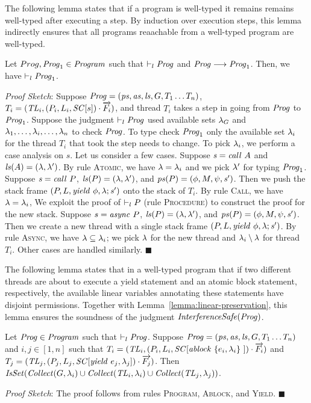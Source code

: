 The following lemma states that if a program is well-typed it remains remains well-typed after executing a step.
By induction over execution steps, this lemma indirectly ensures that all programs reaachable from a well-typed program 
are well-typed.
\begin{lemma}
\label{lemma:linear-preservation}
Let $Prog, \mathit{Prog}_1 \in \mathit{Program}$ such that $\vdash_l \mathit{Prog}$ and $\mathit{Prog} \longrightarrow \mathit{Prog}_1$.
Then, we have $\vdash_l \mathit{Prog}_1$.
\end{lemma}
{\em Proof Sketch}:
Suppose $\mathit{Prog} = (\mathit{ps}, \mathit{as}, \mathit{ls}, G, T_1 \ldots T_n)$, 
$T_i = (\mathit{TL}_i,(P_i,L_i,\mathit{SC}[s])\cdot\overrightarrow{F_i})$,
and thread $T_i$ takes a step in going from $\mathit{Prog}$ to $\mathit{Prog}_1$.
Suppose the judgment $\vdash_l \mathit{Prog}$ used available sets $\lambda_G$ and $\lambda_1,\ldots,\lambda_i,\ldots,\lambda_n$
to check $\mathit{Prog}$.
To type check $\mathit{Prog}_1$ only the available set $\lambda_i$ for the thread $T_i$ that took the step needs to change.
To pick $\lambda_i$, we perform a case analysis on $s$.
Let us consider a few cases.
Suppose $\mathit{s} = \mathit{call}\ A$ and $\mathit{ls}(A) = (\lambda,\lambda')$.
By rule \textsc{Atomic}, we have $\lambda = \lambda_i$ and we pick $\lambda'$ for typing $\mathit{Prog}_1$.
Suppose $\mathit{s} = \mathit{call}\ P$, $\mathit{ls}(P) = (\lambda,\lambda')$, and $\mathit{ps}(P) = (\phi, M, \psi, \mathit{s}')$.
Then we push the stack frame $(P,L,\mathit{yield}\ \phi,\lambda;\mathit{s}')$ onto the stack of $T_i$.
By rule \textsc{Call}, we have $\lambda = \lambda_i$,
We exploit the proof of $\vdash_l P$ (rule \textsc{Procedure}) to construct the proof for the new stack.
Suppose $s = \mathit{async}\ P$, $\mathit{ls}(P) = (\lambda,\lambda')$, and $\mathit{ps}(P) = (\phi, M, \psi, \mathit{s}')$.
Then we create a new thread with a single stack frame $(P,L,\mathit{yield}\ \phi,\lambda;\mathit{s}')$.
By rule \textsc{Async}, we have $\lambda \subseteq \lambda_i$;
we pick $\lambda$ for the new thread and $\lambda_i \setminus \lambda$ for thread $T_i$.
Other cases are handled similarly.
$\blacksquare$

The following lemma states that in a well-typed program that if two different threads 
are about to execute a yield statement and an atomic block statement, respectively,
the available linear variables annotating these statements have disjoint permissions.
Together with Lemma~\ref{lemma:linear-preservation}, this lemma ensures the soundness of the judgment $\mathit{InterferenceSafe}(\mathit{Prog})$.
\begin{lemma}
\label{lemma:linear-non-interference}
Let $\mathit{Prog} \in \mathit{Program}$ such that $\vdash_l \mathit{Prog}$.
Suppose $\mathit{Prog} = (\mathit{ps}, \mathit{as}, \mathit{ls}, G, T_1 \ldots T_n)$
and $i,j \in [1,n]$ such that 
$T_i = (\mathit{TL}_i,(P_i,L_i,\mathit{SC}[\mathit{ablock}\ {\{e_i,\lambda_i\}}\ {]})\cdot\overrightarrow{F_i})$ and
$T_j = (\mathit{TL}_j,(P_j,L_j,\mathit{SC}[\mathit{yield}\ e_j,\lambda_j])\cdot\overrightarrow{F_j})$.
Then $\mathit{IsSet}(\mathit{Collect}(G, \lambda_i) \cup \mathit{Collect}(\mathit{TL}_i, \lambda_i) \cup \mathit{Collect}(\mathit{TL}_j, \lambda_j))$.
\end{lemma}
{\em Proof Sketch}:
The proof follows from rules \textsc{Program}, \textsc{Ablock}, and \textsc{Yield}.
$\blacksquare$

